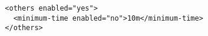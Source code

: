 \begin{verbatim}
  <others enabled="yes">
    <minimum-time enabled="no">10m</minimum-time>
  </others>
\end{verbatim}
